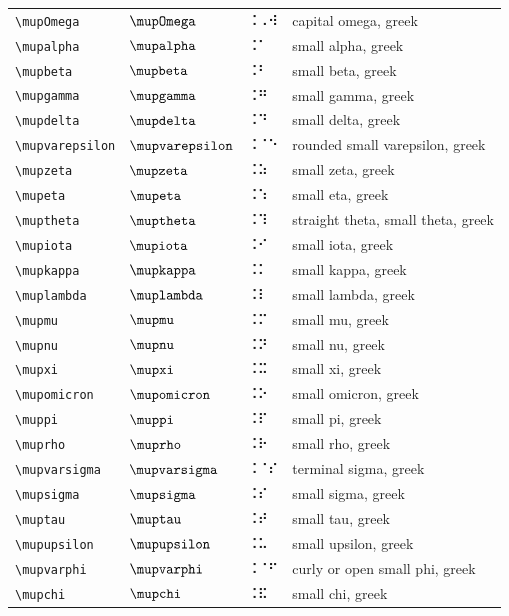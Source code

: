 \documentclass[oneside]{article}
\begin{document}
\begin{longtable}{llll}
\verb|\mupOmega| & $\mupOmega$ &  ⠨⠠⠺  & {capital omega, greek} \\[2ex]
\verb|\mupalpha| & $\mupalpha$ &  ⠨⠁  & {small alpha, greek} \\[2ex]
\verb|\mupbeta| & $\mupbeta$ &  ⠨⠃  & {small beta, greek} \\[2ex]
\verb|\mupgamma| & $\mupgamma$ &  ⠨⠛  & {small gamma, greek} \\[2ex]
\verb|\mupdelta| & $\mupdelta$ &  ⠨⠙  & {small delta, greek} \\[2ex]
\verb|\mupvarepsilon| & $\mupvarepsilon$ &  ⠨⠈⠑  & {rounded small varepsilon, greek} \\[2ex]
\verb|\mupzeta| & $\mupzeta$ &  ⠨⠵  & {small zeta, greek} \\[2ex]
\verb|\mupeta| & $\mupeta$ &  ⠨⠱  & {small eta, greek} \\[2ex]
\verb|\muptheta| & $\muptheta$ &  ⠨⠹  & {straight theta, small theta, greek} \\[2ex]
\verb|\mupiota| & $\mupiota$ &  ⠨⠊  & {small iota, greek} \\[2ex]
\verb|\mupkappa| & $\mupkappa$ &  ⠨⠅  & {small kappa, greek} \\[2ex]
\verb|\muplambda| & $\muplambda$ &  ⠨⠇  & {small lambda, greek} \\[2ex]
\verb|\mupmu| & $\mupmu$ &  ⠨⠍  & {small mu, greek} \\[2ex]
\verb|\mupnu| & $\mupnu$ &  ⠨⠝  & {small nu, greek} \\[2ex]
\verb|\mupxi| & $\mupxi$ &  ⠨⠭  & {small xi, greek} \\[2ex]
\verb|\mupomicron| & $\mupomicron$ &  ⠨⠕  & {small omicron, greek} \\[2ex]
\verb|\muppi| & $\muppi$ &  ⠨⠏  & {small pi, greek} \\[2ex]
\verb|\muprho| & $\muprho$ &  ⠨⠗  & {small rho, greek} \\[2ex]
\verb|\mupvarsigma| & $\mupvarsigma$ &  ⠨⠈⠎  & {terminal sigma, greek} \\[2ex]
\verb|\mupsigma| & $\mupsigma$ &  ⠨⠎  & {small sigma, greek} \\[2ex]
\verb|\muptau| & $\muptau$ &  ⠨⠞  & {small tau, greek} \\[2ex]
\verb|\mupupsilon| & $\mupupsilon$ &  ⠨⠥  & {small upsilon, greek} \\[2ex]
\verb|\mupvarphi| & $\mupvarphi$ &  ⠨⠈⠋  & {curly or open small phi, greek} \\[2ex]
\verb|\mupchi| & $\mupchi$ &  ⠨⠯  & {small chi, greek} \\[2ex]

\end{longtable}
\end{document}
